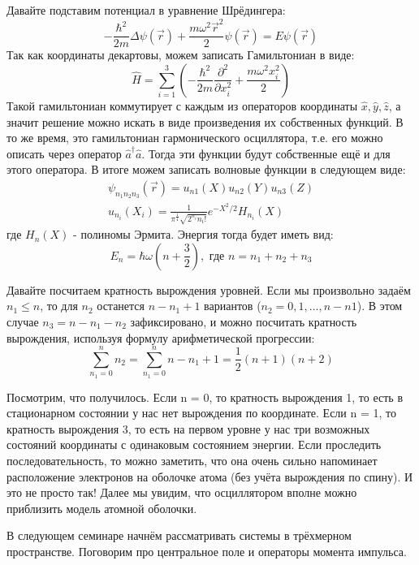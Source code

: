 Давайте подставим потенциал в уравнение Шрёдингера:
\[
-\frac{\hbar^2}{2m}\Delta\psi(\vec{r}) + \frac{m\omega^2\vec{r}^2}{2}\psi(\vec{r}) = E\psi(\vec{r})
\]
Так как координаты декартовы, можем записать Гамильтониан в виде:
\[
\hat H = \sum\limits_{i=1}^3(-\frac{\hbar^2}{2m}\frac{\partial^2}{\partial x_i^2} + \frac{m\omega^2x_i^2}{2})
\]
Такой гамильтониан коммутирует с каждым из операторов координаты $\hat{x}, \hat{y}, \hat{z}$, а значит решение можно искать в виде произведения их собственных функций. В то же время, это гамильтониан гармонического осциллятора, т.е. его можно описать через оператор $\hat{a}^{\dagger}\hat{a}$. Тогда эти функции будут собственные ещё и для этого оператора. В итоге можем записать волновые функции в следующем виде:
\begin{gather*}
\psi_{n_1n_2n_3}(\vec{r}) = u_{n1}(X)u_{n2}(Y)u_{n3}(Z)\\
u_{n_i}(X_i) = \frac{1}{\pi^{\frac{1}{4}}\sqrt{2^{n_i}n_i!}}e^{-X^2/2}H_{n_i}(X)
\end{gather*}
где $H_{n}(X)$ - полиномы Эрмита. Энергия тогда будет иметь вид:
\[
E_n = \hbar\omega(n+\frac{3}{2}), \text{ где } n = n_1 + n_2 + n_3
\]

Давайте посчитаем кратность вырождения уровней. Если мы произвольно задаём $n_1 \leq n$, то для $n_2$ останется $n-n_1+1$ вариантов ($n_2 = 0, 1, ... ,n - n1$). В этом случае $n_3 = n - n_1 - n_2$ зафиксировано, и можно посчитать кратность вырождения, используя формулу арифметической прогрессии: 
\[
\sum\limits_{n_1 = 0}^n n_2 = \sum\limits_{n_1 = 0}^n n-n_1 + 1 = \frac{1}{2}(n+1)(n+2)
\]

Посмотрим, что получилось. Если n = 0, то кратность вырождения 1, то есть в стационарном состоянии у нас нет вырождения по координате. Если n = 1, то кратность вырождения 3, то есть на первом уровне у нас три возможных состояний координаты с одинаковым состоянием энергии. Если проследить последовательность, то можно заметить, что она очень сильно напоминает расположение электронов на оболочке атома (без учёта вырождения по спину). И это не просто так! Далее мы увидим, что осциллятором вполне можно приблизить модель атомной оболочки.

В следующем семинаре начнём рассматривать системы в трёхмерном пространстве. Поговорим про центральное поле и операторы момента импульса.

